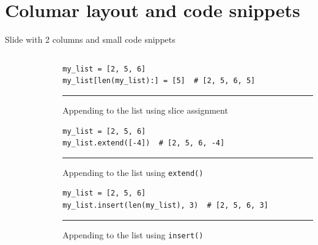 \documentclass[aspectratio=169, 10pt]{beamer}
\begin{document}
\section{Columar layout and code snippets}
\begin{frame}[fragile]{Slide with 2 columns and small code snippets}
    \begin{columns}
    \centering
    \begin{column}{0.52\textwidth}
        \justifying
        \small
        \lipsum[1][4-6]\\[2.5ex]
        \lipsum[2][1-4]
    \end{column}
    \begin{column}{0.45\textwidth}
        \centering
        \scriptsize

        \begin{verbatim}
my_list = [2, 5, 6]
my_list[len(my_list):] = [5]  # [2, 5, 6, 5]
        \end{verbatim}

        \vspace{2pt}
        \hrule
        \vspace{2pt}
        Appending to the list using slice assignment\\[5ex]

        \begin{verbatim}
my_list = [2, 5, 6]
my_list.extend([-4])  # [2, 5, 6, -4]
        \end{verbatim}

        \vspace{2pt}
        \hrule
        \vspace{2pt}
        Appending to the list using \texttt{extend()}\\[5ex]


        \begin{verbatim}
my_list = [2, 5, 6]
my_list.insert(len(my_list), 3)  # [2, 5, 6, 3]
        \end{verbatim}

        \vspace{2pt}
        \hrule
        \vspace{2pt}
        Appending to the list using \texttt{insert()}\\[5ex]

    \end{column}
\end{columns}
\end{frame}
\end{document}

